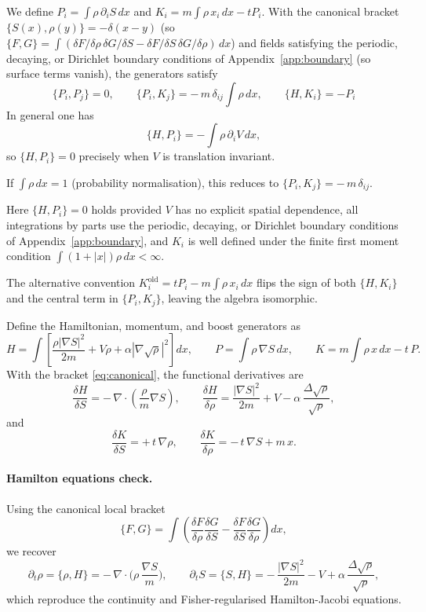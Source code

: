 \documentclass[11pt,a4paper]{article}
\numberwithin{equation}{section}
\theoremstyle{thmcompact}
\theoremstyle{remark}
\begin{document}
We define $P_i=\int \rho\,\partial_i S\,dx$ and $K_i=m\int \rho\,x_i\,dx - tP_i$.
With the canonical bracket $\{S(x),\rho(y)\}=-\delta(x-y)$ (so
$\{F,G\}=\int(\delta F/\delta\rho\,\delta G/\delta S-\delta F/\delta S\,\delta G/\delta\rho)\,dx$)
and fields satisfying the periodic, decaying, or Dirichlet boundary conditions
of Appendix~\ref{app:boundary} (so surface terms vanish), the generators satisfy
\[
\{P_i,P_j\}=0,\qquad \{P_i,K_j\}=-\,m\,\delta_{ij}\!\int\!\rho\,dx,\qquad \{H,K_i\}=-P_i
\]
In general one has
\[
\{H,P_i\}=-\!\int \rho\,\partial_i V\,dx,
\]
so $\{H,P_i\}=0$ precisely when $V$ is translation invariant.

If $\int\rho\,dx=1$ (probability normalisation), this reduces to $\{P_i,K_j\}=-\,m\,\delta_{ij}$.

Here $\{H,P_i\}=0$ holds provided $V$ has no explicit spatial dependence, all
integrations by parts use the periodic, decaying, or Dirichlet boundary
conditions of Appendix~\ref{app:boundary}, and $K_i$ is well defined under the
finite first moment condition $\int (1+|x|)\rho\,dx<\infty$.

The alternative convention $K_i^{\mathrm{old}}=tP_i - m\int \rho\,x_i\,dx$
flips the sign of both $\{H,K_i\}$ and the central term in $\{P_i,K_j\}$,
leaving the algebra isomorphic.

Define the Hamiltonian, momentum, and boost generators as
\[
H=\int\!\!\left[\frac{\rho|\nabla S|^2}{2m}+V\rho+\alpha|\nabla\sqrt\rho|^2\right]\!dx,
\qquad
P=\int \rho\,\nabla S\,dx,
\qquad
K=m\!\int \rho\,x\,dx - t\,P.
\]
With the bracket \eqref{eq:canonical}, the functional derivatives are
\[
\frac{\delta H}{\delta S}
=-\,\nabla\!\cdot\!\!\left(\frac{\rho}{m}\nabla S\right),
\qquad
\frac{\delta H}{\delta\rho}
=\frac{|\nabla S|^2}{2m}+V-\alpha\,\frac{\Delta\sqrt\rho}{\sqrt\rho},
\]
and
\[
\frac{\delta K}{\delta S}=+\,t\,\nabla\rho,
\qquad
\frac{\delta K}{\delta\rho}=-\,t\,\nabla S+m\,x.
\]

\paragraph{Hamilton equations check.}
Using the canonical local bracket
\[
\{F,G\}=\int\!\!\left(
\frac{\delta F}{\delta \rho}\frac{\delta G}{\delta S}
-\frac{\delta F}{\delta S}\frac{\delta G}{\delta \rho}
\right)\!dx,
\]
we recover
\[
\partial_t\rho=\{\rho,H\}
=-\,\nabla\!\cdot\!\Big(\rho\,\frac{\nabla S}{m}\Big),
\qquad
\partial_t S=\{S,H\}
=-\,\frac{|\nabla S|^2}{2m}-V
+\alpha\,\frac{\Delta\sqrt\rho}{\sqrt\rho},
\]
which reproduce the continuity and Fisher-regularised Hamilton-Jacobi equations.
\end{document}
